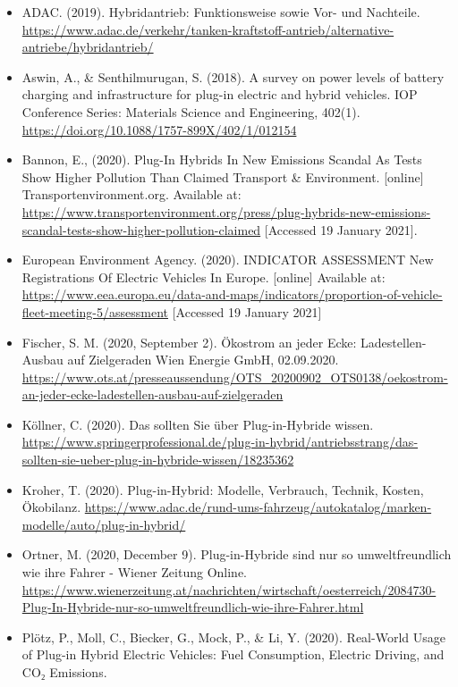 \documentclass[
]{book}
\providecommand{\tightlist}{%
  \setlength{\itemsep}{0pt}\setlength{\parskip}{0pt}}
\begin{document}
\begin{itemize}
\tightlist
\item
  ADAC. (2019). Hybridantrieb: Funktionsweise sowie Vor- und Nachteile. \url{https://www.adac.de/verkehr/tanken-kraftstoff-antrieb/alternative-antriebe/hybridantrieb/}
\item
  Aswin, A., \& Senthilmurugan, S. (2018). A survey on power levels of battery charging and infrastructure for plug-in electric and hybrid vehicles. IOP Conference Series: Materials Science and Engineering, 402(1). \url{https://doi.org/10.1088/1757-899X/402/1/012154}
\item
  Bannon, E., (2020). Plug-In Hybrids In New Emissions Scandal As Tests Show Higher Pollution Than Claimed \textbar{} Transport \& Environment. {[}online{]} Transportenvironment.org. Available at: \url{https://www.transportenvironment.org/press/plug-hybrids-new-emissions-scandal-tests-show-higher-pollution-claimed} {[}Accessed 19 January 2021{]}.
\item
  European Environment Agency. (2020). INDICATOR ASSESSMENT New Registrations Of Electric Vehicles In Europe. {[}online{]} Available at: \url{https://www.eea.europa.eu/data-and-maps/indicators/proportion-of-vehicle-fleet-meeting-5/assessment} {[}Accessed 19 January 2021{]}
\item
  Fischer, S. M. (2020, September 2). Ökostrom an jeder Ecke: Ladestellen-Ausbau auf Zielgeraden \textbar{} Wien Energie GmbH, 02.09.2020. \url{https://www.ots.at/presseaussendung/OTS_20200902_OTS0138/oekostrom-an-jeder-ecke-ladestellen-ausbau-auf-zielgeraden}
\item
  Köllner, C. (2020). Das sollten Sie über Plug-in-Hybride wissen. \url{https://www.springerprofessional.de/plug-in-hybrid/antriebsstrang/das-sollten-sie-ueber-plug-in-hybride-wissen/18235362}
\item
  Kroher, T. (2020). Plug-in-Hybrid: Modelle, Verbrauch, Technik, Kosten, Ökobilanz. \url{https://www.adac.de/rund-ums-fahrzeug/autokatalog/marken-modelle/auto/plug-in-hybrid/}
\item
  Ortner, M. (2020, December 9). Plug-in-Hybride sind nur so umweltfreundlich wie ihre Fahrer - Wiener Zeitung Online. \url{https://www.wienerzeitung.at/nachrichten/wirtschaft/oesterreich/2084730-Plug-In-Hybride-nur-so-umweltfreundlich-wie-ihre-Fahrer.html}
\item
  Plötz, P., Moll, C., Biecker, G., Mock, P., \& Li, Y. (2020). Real-World Usage of Plug-in Hybrid Electric Vehicles: Fuel Consumption, Electric Driving, and CO₂ Emissions.

\end{itemize}
\end{document}
